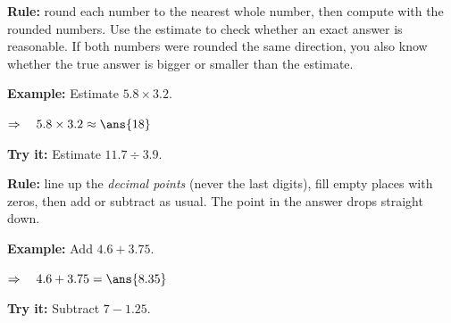 \documentclass[12pt]{article}
\begin{document}


\begin{formulabox}
\textbf{Rule:} round each number to the nearest whole number, then compute
with the rounded numbers. Use the estimate to check whether an exact answer
is reasonable. If both numbers were rounded the same direction, you also know
whether the true answer is bigger or smaller than the estimate.
\end{formulabox}

\begin{examplebox}
\textbf{Example:} \quad Estimate $5.8 \times 3.2$.

$\Rightarrow\quad 5.8 \times 3.2 \approx \ans{18}$
\end{examplebox}

\begin{tryitbox}
\textbf{Try it:} \quad Estimate $11.7 \div 3.9$.\\[2pt]
\end{tryitbox}


\begin{formulabox}
\textbf{Rule:} line up the \emph{decimal points} (never the last digits),
fill empty places with zeros, then add or subtract as usual. The point in
the answer drops straight down.
\end{formulabox}

\begin{examplebox}
\textbf{Example:} \quad Add $4.6 + 3.75$.

$\Rightarrow\quad 4.6 + 3.75 = \ans{8.35}$
\end{examplebox}

\begin{tryitbox}
\textbf{Try it:} \quad Subtract $7 - 1.25$.\\[2pt]
\end{tryitbox}
\end{document}
